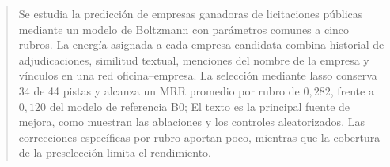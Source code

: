 \begin{abstract}
Se estudia la predicción de empresas ganadoras de licitaciones públicas mediante un modelo de Boltzmann con parámetros comunes a cinco rubros. La energía asignada a cada empresa candidata combina historial de adjudicaciones, similitud textual, menciones del nombre de la empresa y vínculos en una red oficina--empresa. La selección mediante lasso conserva 34 de 44 pistas y alcanza un MRR promedio por rubro de $0{,}282$, frente a $0{,}120$ del modelo de referencia B0; El texto es la principal fuente de mejora, como muestran las ablaciones y los controles aleatorizados. Las correcciones específicas por rubro aportan poco, mientras que la cobertura de la preselección limita el rendimiento.
\end{abstract}
